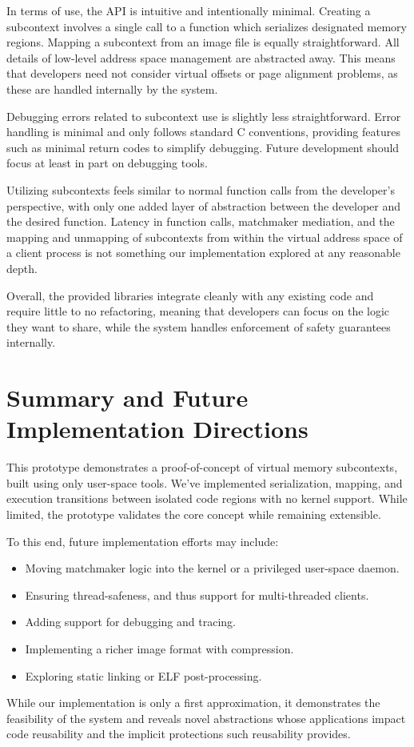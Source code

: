 In terms of use, the API is intuitive and intentionally minimal. Creating a subcontext involves a single call to a function which serializes designated memory regions. Mapping a subcontext from an image file is equally straightforward. All details of low-level address space management are abstracted away. This means that developers need not consider virtual offsets or page alignment problems, as these are handled internally by the system.

Debugging errors related to subcontext use is slightly less straightforward. Error handling is minimal and only follows standard C conventions, providing features such as minimal return codes to simplify debugging. Future development should focus at least in part on debugging tools.

Utilizing subcontexts feels similar to normal function calls from the developer's perspective, with only one added layer of abstraction between the developer and the desired function. Latency in function calls, matchmaker mediation, and the mapping and unmapping of subcontexts from within the virtual address space of a client process is not something our implementation explored at any reasonable depth.

Overall, the provided libraries integrate cleanly with any existing code and require little to no refactoring, meaning that developers can focus on the logic they want to share, while the system handles enforcement of safety guarantees internally.


\section*{Summary and Future Implementation Directions}
This prototype demonstrates a proof-of-concept of virtual memory subcontexts, built using only user-space tools. We’ve implemented serialization, mapping, and execution transitions between isolated code regions with no kernel support. While limited, the prototype validates the core concept while remaining extensible.

To this end, future implementation efforts may include:
\begin{itemize}
    \item Moving matchmaker logic into the kernel or a privileged user-space daemon.
    \item Ensuring thread-safeness, and thus support for multi-threaded clients.
    \item Adding support for debugging and tracing.
    \item Implementing a richer image format with compression.
    \item Exploring static linking or ELF post-processing.
\end{itemize}

While our implementation is only a first approximation, it demonstrates the feasibility of the system and reveals novel abstractions whose applications impact code reusability and the implicit protections such reusability provides.